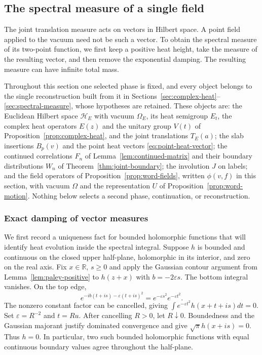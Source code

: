 \subsection{The spectral measure of a single field}
\label{sec:trace-spectrum}
The joint translation measure acts on vectors in Hilbert space. A point
field applied to the vacuum need not be such a vector. To obtain the
spectral measure of its two-point function, we first keep a positive heat
height, take the measure of the resulting vector, and then remove the
exponential damping. The resulting measure can have infinite total mass.

Throughout this section one selected phase is fixed, and every object
belongs to the single reconstruction built from it in
Sections~\ref{sec:complex-heat}--\ref{sec:spectral-measure}, whose
hypotheses are retained. These objects are: the Euclidean Hilbert space
$\mathcal H_E$ with vacuum $\Omega_E$, its heat semigroup $E_t$, the
complex heat operators $E(z)$ and the unitary group $V(t)$ of
Proposition~\ref{prop:complex-heat}, and the joint translations $T_E(a)$;
the slab insertions $B_p(v)$ and the point heat vectors
\eqref{eq:point-heat-vector}; the continued correlations $F_n$ of
Lemma~\ref{lem:continued-matrix} and their boundary distributions $W_n$
of Theorem~\ref{thm:joint-boundary}; the involution $J$ on labels; and
the field operators of Proposition~\ref{prop:word-fields}, written
$\phi(v,f)$ in this section, with vacuum $\Omega$ and the representation
$U$ of Proposition~\ref{prop:word-motion}. Nothing below selects a second
phase, continuation, or reconstruction.

\subsubsection{Exact damping of vector measures}
We first record a uniqueness fact for bounded holomorphic functions that
will identify heat evolution inside the spectral integral. Suppose $h$ is
bounded and continuous on the closed upper half-plane, holomorphic in its
interior, and zero on the real axis. Fix $x\in\mathbb R$, $s\geq0$ and
apply the Gaussian contour argument from
Lemma~\ref{lem:paley-positive} to $h(z+x)$ with $b=-2\varepsilon s$.
The bottom integral vanishes. On the top edge,
\[
 e^{-ib(t+is)-\varepsilon(t+is)^2}
       =e^{-\varepsilon s^2}e^{-\varepsilon t^2}.
\]
The nonzero constant factor can be cancelled, giving
$\int e^{-\varepsilon t^2}h(x+t+is)dt=0$.
Set $\varepsilon=R^{-2}$ and $t=Ru$. After cancelling $R>0$, let
$R\downarrow0$. Boundedness and the Gaussian majorant justify dominated
convergence and give $\sqrt\pi h(x+is)=0$. Thus $h=0$. In particular,
two such bounded holomorphic functions with equal continuous boundary
values agree throughout the half-plane.

